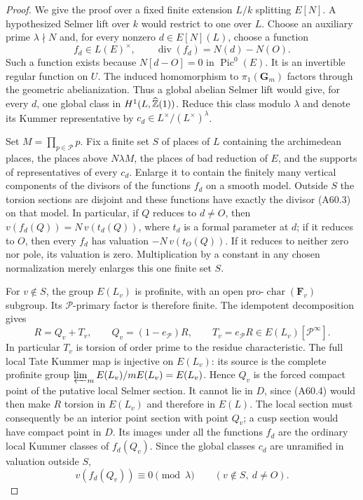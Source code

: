 \begin{proof}
We give the proof over a fixed finite extension $L/k$ splitting
$E[N]$. A hypothesized Selmer lift over $k$ would restrict to one
over $L$. Choose an auxiliary prime $\lambda\nmid N$ and, for every
nonzero $d\in E[N](L)$, choose a function
\[
 f_d\in L(E)^\times,\qquad
 \operatorname{div}(f_d)=N(d)-N(O).
 \tag{A60.3}
\]
Such a function exists because $N[d-O]=0$ in $\operatorname{Pic}^0(E)$.
It is an invertible regular function on $U$. The induced homomorphism
to $\pi_1(\mathbf G_m)$ factors through the geometric abelianization.
Thus a global abelian Selmer lift would give, for every $d$, one
global class in $H^1(L,\widehat{\mathbb Z}(1))$. Reduce this class modulo
$\lambda$ and denote its Kummer representative by
$c_d\in L^\times/(L^\times)^\lambda$.

Set $M=\prod_{p\in\mathcal P}p$. Fix a finite set $S$ of places of
$L$ containing the archimedean places, the places above $N\lambda M$,
the places of bad reduction of $E$, and the supports of representatives
of every $c_d$. Enlarge it to contain the finitely many vertical
components of the divisors of the functions $f_d$ on a smooth model.
Outside $S$ the torsion sections are disjoint and these functions
have exactly the divisor (A60.3) on that model. In particular, if
$Q$ reduces to $d\ne O$, then
$v(f_d(Q))=N\,v(t_d(Q))$, where $t_d$ is a formal parameter at $d$;
if it reduces to $O$, then every $f_d$ has valuation
$-N\,v(t_O(Q))$. If it reduces to neither zero nor pole, its
valuation is zero. Multiplication by a constant in any chosen
normalization merely enlarges this one finite set $S$.

For $v\notin S$, the group $E(L_v)$ is profinite, with an open
pro-$\operatorname{char}(\mathbf F_v)$ subgroup. Its
$\mathcal P$-primary factor is therefore finite. The idempotent
decomposition gives
\[
 R=Q_v+T_v,\qquad
 Q_v=(1-e_{\mathcal P})R,\qquad
 T_v=e_{\mathcal P}R\in E(L_v)[\mathcal P^\infty].
 \tag{A60.4}
\]
In particular $T_v$ is torsion of order prime to the residue
characteristic. The full local Tate Kummer map is injective on
$E(L_v)$: its source is the complete profinite group
$\varprojlim_m E(L_v)/mE(L_v)=E(L_v)$. Hence $Q_v$ is the forced
compact point of the putative local Selmer section. It cannot lie
in $D$, since (A60.4) would then make $R$ torsion in $E(L_v)$ and
therefore in $E(L)$. The local section must consequently be an
interior point section with point $Q_v$; a cusp section would have
compact point in $D$. Its images under all the functions $f_d$
are the ordinary local Kummer classes of $f_d(Q_v)$. Since the
global classes $c_d$ are unramified in valuation outside $S$,
\[
 v(f_d(Q_v))\equiv0\pmod\lambda
 \qquad(v\notin S,\ d\ne O).
 \tag{A60.5}
\]


\end{proof}
